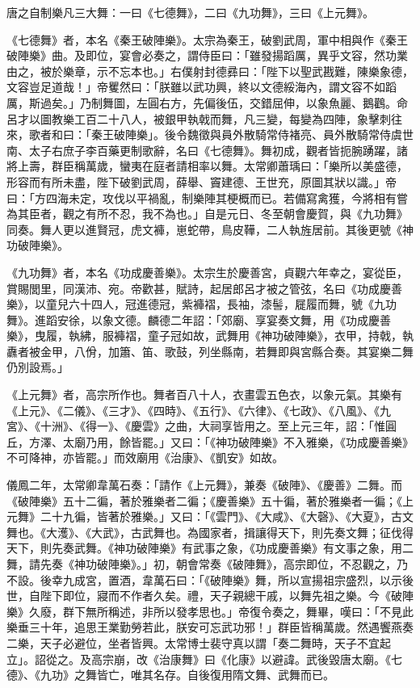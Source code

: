 \begin{pinyinscope}
 唐之自制樂凡三大舞：一曰《七德舞》，二曰《九功舞》，三曰《上元舞》。



 《七德舞》者，本名《秦王破陣樂》。太宗為秦王，破劉武周，軍中相與作《秦王破陣樂》曲。及即位，宴會必奏之，謂侍臣曰：「雖發揚蹈厲，異乎文容，然功業由之，被於樂章，示不忘本也。」右僕射封德彞曰：「陛下以聖武戡難，陳樂象德，文容豈足道哉！」帝矍然曰：「朕雖以武功興，終以文德綏海內，謂文容不如蹈厲，斯過矣。」乃制舞圖，左圓右方，先偏後伍，交錯屈伸，以象魚麗、鵝鸛。命呂才以圖教樂工百二十八人，被銀甲執戟而舞，凡三變，每變為四陣，象擊刺往來，歌者和曰：「秦王破陣樂」。後令魏徵與員外散騎常侍褚亮、員外散騎常侍虞世南、太子右庶子李百藥更制歌辭，名曰《七德舞》。舞初成，觀者皆扼腕踴躍，諸將上壽，群臣稱萬歲，蠻夷在庭者請相率以舞。太常卿蕭瑀曰：「樂所以美盛德，形容而有所未盡，陛下破劉武周，薛舉、竇建德、王世充，原圖其狀以識。」帝曰：「方四海未定，攻伐以平禍亂，制樂陣其梗概而已。若備寫禽獲，今將相有嘗為其臣者，觀之有所不忍，我不為也。」自是元日、冬至朝會慶賀，與《九功舞》同奏。舞人更以進賢冠，虎文褲，崽蛇帶，鳥皮鞾，二人執旌居前。其後更號《神功破陣樂》。



 《九功舞》者，本名《功成慶善樂》。太宗生於慶善宮，貞觀六年幸之，宴從臣，賞賜閭里，同漢沛、宛。帝歡甚，賦詩，起居郎呂才被之管弦，名曰《功成慶善樂》，以童兒六十四人，冠進德冠，紫褲褶，長袖，漆髻，屣履而舞，號《九功舞》。進蹈安徐，以象文德。麟德二年詔：「郊廟、享宴奏文舞，用《功成慶善樂》，曳履，執紼，服褲褶，童子冠如故，武舞用《神功破陣樂》，衣甲，持戟，執纛者被金甲，八佾，加簫、笛、歌鼓，列坐縣南，若舞即與宮縣合奏。其宴樂二舞仍別設焉。」



 《上元舞》者，高宗所作也。舞者百八十人，衣畫雲五色衣，以象元氣。其樂有《上元》、《二儀》、《三才》、《四時》、《五行》、《六律》、《七政》、《八風》、《九宮》、《十洲》、《得一》、《慶雲》之曲，大祠享皆用之。至上元三年，詔：「惟圓丘，方澤、太廟乃用，餘皆罷。」又曰：「《神功破陣樂》不入雅樂，《功成慶善樂》不可降神，亦皆罷。」而效廟用《治康》、《凱安》如故。



 儀鳳二年，太常卿韋萬石奏：「請作《上元舞》，兼奏《破陣》、《慶善》二舞。而《破陣樂》五十二徧，著於雅樂者二徧；《慶善樂》五十徧，著於雅樂者一徧；《上元舞》二十九徧，皆著於雅樂。」又曰：「《雲門》、《大咸》、《大磬》、《大夏》，古文舞也。《大濩》、《大武》，古武舞也。為國家者，揖讓得天下，則先奏文舞；征伐得天下，則先奏武舞。《神功破陣樂》有武事之象，《功成慶善樂》有文事之象，用二舞，請先奏《神功破陣樂》。」初，朝會常奏《破陣舞》，高宗即位，不忍觀之，乃不設。後幸九成宮，置酒，韋萬石曰：「《破陣樂》舞，所以宣揚祖宗盛烈，以示後世，自陛下即位，寢而不作者久矣。禮，天子親總干戚，以舞先祖之樂。今《破陣樂》久廢，群下無所稱述，非所以發孝思也。」帝復令奏之，舞畢，嘆曰：「不見此樂垂三十年，追思王業勤勞若此，朕安可忘武功邪！」群臣皆稱萬歲。然遇饗燕奏二樂，天子必避位，坐者皆興。太常博士裴守真以謂「奏二舞時，天子不宜起立」。詔從之。及高宗崩，改《治康舞》曰《化康》以避諱。武後毀唐太廟。《七德》、《九功》之舞皆亡，唯其名存。自後復用隋文舞、武舞而已。




\end{pinyinscope}
